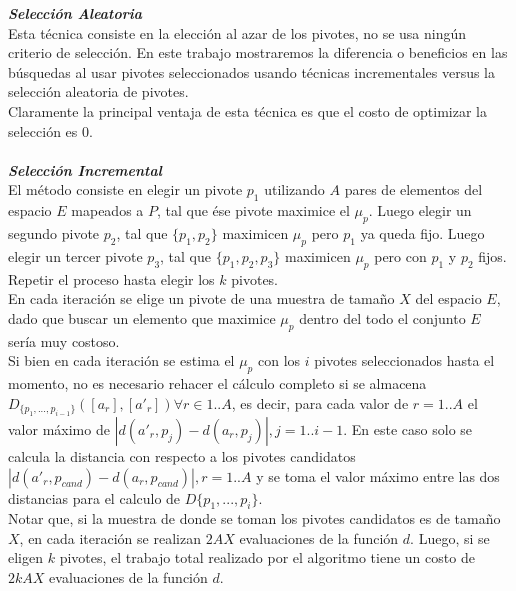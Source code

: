 \noindent \textit{\textbf{Selecci\'on Aleatoria}}\\

Esta t\'ecnica consiste en la elecci\'on al azar de los pivotes, no se usa ning\'un criterio de selecci\'on. En este trabajo mostraremos la diferencia o beneficios en las b\'usquedas al usar pivotes  seleccionados usando t\'ecnicas incrementales versus la selecci\'on aleatoria de pivotes.\\

Claramente la principal ventaja de esta t\'ecnica es que el costo de optimizar la selecci\'on es $0$.\\
 \\
 
\noindent \textit{\textbf{Selecci\'on Incremental}}\\

El m\'etodo consiste en elegir un pivote $p_1$ utilizando $A$ pares de elementos del espacio $E$ mapeados a $P$, tal que \'ese pivote maximice el $\mu_p$. Luego elegir un segundo pivote $p_2$, tal que $\{p_1,p_2\}$ maximicen $\mu_p$ pero $p_1$ ya queda fijo. Luego elegir un tercer pivote $p_3$, tal que $\{p_1,p_2,p_3\}$  maximicen $\mu_p$ pero con $p_1$ y  $p_2$ fijos. Repetir el proceso hasta elegir los $k$ pivotes.\\

En cada iteraci\'on se elige un pivote de una muestra de tama\~no $X$ del espacio $E$, dado que buscar un elemento que maximice $\mu_p$ dentro del todo el conjunto $E$  ser\'ia muy costoso.\\


Si bien en cada iteraci\'on se estima el $\mu_p$ con los $i$ pivotes seleccionados hasta el momento, no es necesario rehacer el c\'alculo completo si se almacena $D_{\{p_1,...,p_{i-1}\}}([a_r],[a'_r]) \forall r \in 1..A$, es decir, para cada valor de $r=1..A$ el valor m\'aximo de $|d(a'_r, p_j) - d(a_r, p_j)|, j = 1..i-1$. En este caso solo se calcula la distancia con respecto a los pivotes candidatos $|d(a'_r, p_{cand}) - d(a_r, p_{cand})|, r = 1..A$ y se toma el valor m\'aximo entre las dos distancias para el calculo de $D\{p_1, ...,p_i\}$.\\

Notar que, si la muestra de donde se toman los pivotes candidatos es de tama\~no $X$, en cada iteraci\'on se realizan $2AX$ evaluaciones de la funci\'on $d$. Luego, si se eligen $k$ pivotes, el trabajo total realizado por el algoritmo tiene un costo de $2kAX$ evaluaciones de la funci\'on $d$.\\